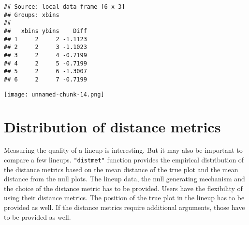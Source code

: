 \begin{Shaded}
\begin{Highlighting}[]
\StringTok{ }\NormalTok{(}\NormalTok{(}\NormalTok{(} \NormalTok{), } \NormalTok{(}\NormalTok{, }\NormalTok{), }\NormalTok{, }\NormalTok{, }\NormalTok{, }\NormalTok{, } \NormalTok{, } \NormalTok{)}
\end{Highlighting}
\end{Shaded}

\begin{verbatim}
## Source: local data frame [6 x 3]
## Groups: xbins
## 
##   xbins ybins    Diff
## 1     2     2 -1.1123
## 2     2     3 -1.1023
## 3     2     4 -0.7199
## 4     2     5 -0.7199
## 5     2     6 -1.3007
## 6     2     7 -0.7199
\end{verbatim}

\begin{Shaded}
\begin{Highlighting}[]
\end{Highlighting}
\end{Shaded}

\begin{figure*}[hbtp]
\begin{center}
\texttt{[image: unnamed-chunk-14.png]}
\end{center}
\end{figure*}

\section{Distribution of distance
metrics}\label{distribution-of-distance-metrics}

Measuring the quality of a lineup is interesting. But it may also be
important to compare a few lineups. \texttt{"distmet"} function provides
the empirical distribution of the distance metrics based on the mean
distance of the true plot and the mean distance from the null plots. The
lineup data, the null generating mechanism and the choice of the
distance metric has to be provided. Users have the flexibility of using
their distance metrics. The position of the true plot in the lineup has
to be provided as well. If the distance metrics require additional
arguments, those have to be provided as well.


